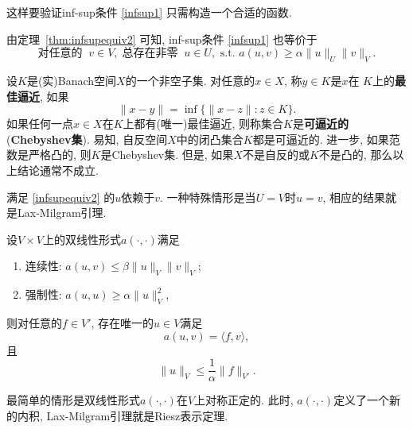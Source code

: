 这样要验证inf-sup条件 \eqref{infsup1} 只需构造一个合适的函数.

由定理~\ref{thm:infsupequiv2} 可知, inf-sup条件 \eqref{infsup1} 也等价于 %
\begin{equation*}%
\textrm{对任意的 }~v\in V,\; \textrm{总存在非零 }~u \in U, \textrm{ s.t. } a(u, v)\geq\alpha\|u\|_U\|v\|_V.
\end{equation*}

\begin{remark}
设$K$是(实)Banach空间$X$的一个非空子集. 对任意的$x\in X$,
称$y\in K$是$x$在 $K$上的\textbf{最佳逼近}, 如果
\[
\|x - y\|= \inf\{\|x - z\|: z\in K\}.
\]
如果任何一点$x\in X$在$K$上都有(唯一)最佳逼近, 则称集合$K$是\textbf{可逼近的}(\textbf{Chebyshev集}). 易知, 自反空间$X$中的闭凸集合$K$都是可逼近的. 进一步, 如果范数是严格凸的, 则$K$是Chebyshev集. 但是, 如果$X$不是自反的或$K$不是凸的, 那么以上结论通常不成立.
\end{remark}


满足 \eqref{infsupequiv2} 的$u$依赖于$v$. 一种特殊情形是当$U=V$时$u = v$,  相应的结果就是Lax-Milgram引理.

\begin{lemma}\label{laxmilgramlemma}
设$V\times V$上的双线性形式$a(\cdot, \cdot)$满足
\begin{enumerate}
\item 连续性: $a(u, v)\leq\beta\|u\|_V\|v\|_V$;
\item 强制性: $a(u, u)\geq\alpha\|u\|_V^2$,
\end{enumerate}
则对任意的$f\in V'$, 存在唯一的$u\in V$满足
\[
a(u, v) = \langle f, v\rangle,
\]
且
\[
\|u\|_V\leq\frac{1}{\alpha}\|f\|_{V'}.
\]
\end{lemma}

最简单的情形是双线性形式$a(\cdot, \cdot)$在$V$上对称正定的. 此时, $a(\cdot, \cdot)$定义了一个新的内积, Lax-Milgram引理就是Riesz表示定理.





